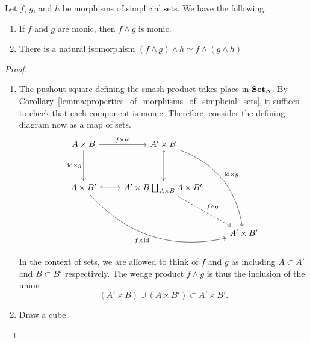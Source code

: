 \documentclass[main.tex]{subfiles}
\begin{document}
\begin{lemma}
  \label{lemma:facts_about_smash_product}
  Let $f$, $g$, and $h$ be morphisms of simplicial sets. We have the following.
  \begin{enumerate}
    \item If $f$ and $g$ are monic, then $f \wedge g$ is monic.

    \item There is a natural isomorphism $(f \wedge g) \wedge h \simeq f \wedge (g \wedge h)$
  \end{enumerate}
\end{lemma}
\begin{proof}
  \leavevmode
  \begin{enumerate}
    \item The pushout square defining the smash product takes place in $\operatorname{\mathbf{Set}_{\Delta}}$. By \hyperref[lemma:properties_of_morphisms_of_simplicial_sets]{Corollary~\ref*{lemma:properties_of_morphisms_of_simplicial_sets}}, it suffices to check that each component is monic. Therefore, consider the defining diagram now as a map of sets.
      \begin{equation*}
        \begin{tikzcd}[row sep=huge]
          A \times B
          \arrow[r, "f \times \id"]
          \arrow[d, swap, "\id \times g"]
          & A' \times B
          \arrow[ddr, bend left, "\id \times g"]
          \arrow[d, hookrightarrow]
          \\
          A \times B'
          \arrow[r, hookrightarrow]
          \arrow[rrd, swap, bend right, "f \times \id"]
          & A' \times B \coprod_{A \times B} A \times B'
          \arrow[dr, dashed, "f \wedge g"]
          \\
          && A' \times B'
        \end{tikzcd}
      \end{equation*}
      In the context of sets, we are allowed to think of $f$ and $g$ as including $A \subset A'$ and $B \subset B'$ respectively. The wedge product $f \wedge g$ is thus the inclusion of the union
      \begin{equation*}
        (A' \times B) \cup (A \times B') \subset A' \times B'.
      \end{equation*}

    \item Draw a cube.
  \end{enumerate}
\end{proof}
\end{document}

